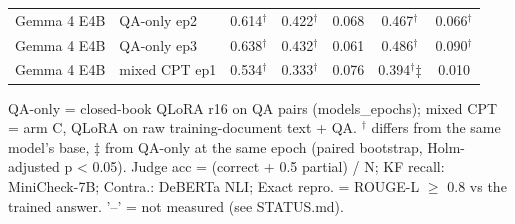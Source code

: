 \begin{table}[t]
{\begin{tabular}{llccccc}
Gemma 4 E4B & QA-only ep2 & 0.614$^\dagger$ & 0.422$^\dagger$ & 0.068 & 0.467$^\dagger$ & 0.066$^\dagger$ \\
Gemma 4 E4B & QA-only ep3 & 0.638$^\dagger$ & 0.432$^\dagger$ & 0.061 & 0.486$^\dagger$ & 0.090$^\dagger$ \\
Gemma 4 E4B & mixed CPT ep1 & 0.534$^\dagger$ & 0.333$^\dagger$ & 0.076 & 0.394$^\dagger$‡ & 0.010 \\
\bottomrule
\end{tabular}}
\par\smallskip\footnotesize QA-only = closed-book QLoRA r16 on QA pairs (models\_epochs); mixed CPT = arm C, QLoRA on raw training-document text + QA. $^\dagger$ differs from the same model's base, ‡ from QA-only at the same epoch (paired bootstrap, Holm-adjusted p < 0.05). Judge acc = (correct + 0.5 partial) / N; KF recall: MiniCheck-7B; Contra.: DeBERTa NLI; Exact repro. = ROUGE-L $\geq$ 0.8 vs the trained answer. '–' = not measured (see STATUS.md).
\end{table}
